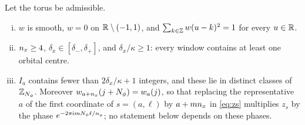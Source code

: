 \begin{lemma}\label{lem:frame-consistency}
Let the torus be admissible.
\begin{enumerate}[(i)]
\item $w$ is smooth, $w=0$ on $\mathbb{R}\setminus(-1,1)$, and $\sum_{k\in\mathbb{Z}}w(u-k)^2=1$ for every $u\in\mathbb{R}$.
\item $n_x\ge4$, $\delta_x\in[\delta_-,\delta_+]$, and $\delta_x/\kappa\ge1$: every window contains at least one
orbital centre.
\item $I_a$ contains fewer than $2\delta_x/\kappa+1$ integers, and these lie in distinct classes of
$\mathbb{Z}_{N_{\phi}}$. Moreover $w_{a+n_x}(j+N_{\phi})=w_a(j)$, so that replacing the representative $a$ of the first
coordinate of $s=(a,\ell)$ by $a+mn_x$ in \eqref{eq:zs} multiplies $z_s$ by the phase
$e^{-2\pi\mathrm{i} mN_{\phi}\ell/n_y}$; no statement below depends on these phases.
\end{enumerate}
\end{lemma}

